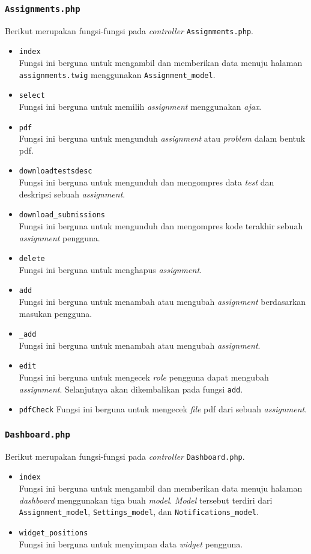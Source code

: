 \subsubsection{\texttt{Assignments.php}}
Berikut merupakan fungsi-fungsi pada \textit{controller} \texttt{Assignments.php}.
\begin{itemize}
	\item \texttt{index}\\
	Fungsi ini berguna untuk mengambil dan memberikan data menuju halaman \texttt{assignments.twig} menggunakan \texttt{Assignment\_model}.
	\item \texttt{select}\\
	Fungsi ini berguna untuk memilih \textit{assignment} menggunakan \textit{ajax}.
	\item \texttt{pdf}\\
	Fungsi ini berguna untuk mengunduh \textit{assignment} atau \textit{problem} dalam bentuk pdf.
	\item \texttt{downloadtestsdesc}\\
	Fungsi ini berguna untuk mengunduh dan mengompres data \textit{test} dan deskripsi sebuah \textit{assignment}.
	\item \texttt{download\_submissions}\\
	Fungsi ini berguna untuk mengunduh dan mengompres kode terakhir sebuah \textit{assignment} pengguna.
	\item \texttt{delete}\\
	Fungsi ini berguna untuk menghapus \textit{assignment}.
	\item \texttt{add}\\
	Fungsi ini berguna untuk menambah atau mengubah \textit{assignment} berdasarkan masukan pengguna.
	\item \texttt{\_add}\\
	Fungsi ini berguna untuk menambah atau mengubah \textit{assignment}.
	\item \texttt{edit}\\
	Fungsi ini berguna untuk mengecek \textit{role} pengguna dapat mengubah \textit{assignment}. Selanjutnya akan dikembalikan pada fungsi \texttt{add}. 
	\item \texttt{pdfCheck}
	Fungsi ini berguna untuk mengecek \textit{file} pdf dari sebuah \textit{assignment}.
\end{itemize}

\subsubsection{\texttt{Dashboard.php}}
Berikut merupakan fungsi-fungsi pada \textit{controller} \texttt{Dashboard.php}.
\begin{itemize}
	\item \texttt{index}\\
	Fungsi ini berguna untuk mengambil dan memberikan data menuju halaman \textit{dashboard} menggunakan tiga buah \textit{model}. \textit{Model} tersebut terdiri dari \texttt{Assignment\_model}, \texttt{Settings\_model}, dan \texttt{Notifications\_model}.
	\item \texttt{widget\_positions}\\
	Fungsi ini berguna untuk menyimpan data \textit{widget} pengguna.
\end{itemize}

